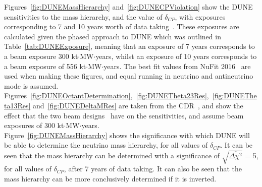 Figures~\ref{fig:DUNEMassHierarchy} and~\ref{fig:DUNECPViolation} show the DUNE sensitivities to the mass hierarchy, and the value of $\delta_{CP}$, with exposures corresponding to 7 and 10 years worth of data taking~\citep{Elizabeth_01_17}. These exposures are calculated given the phased approach to DUNE which was outlined in Table~\ref{tab:DUNEExposure}, meaning that an exposure of 7 years corresponds to a beam exposure 300 kt$\cdot$MW$\cdot$years, whilst an exposure of 10 years corresponds to a beam exposure of 556 kt$\cdot$MW$\cdot$years. The best fit values from NuFit 2016~\citep{NuFit2016} are used when making these figures, and equal running in neutrino and antineutrino mode is assumed. Figures~\ref{fig:DUNEOctantDetermination},~\ref{fig:DUNETheta23Res},~\ref{fig:DUNETheta13Res} and~\ref{fig:DUNEDeltaMRes} are taken from the CDR~\citep{DUNECDR_V2}, and show the effect that the two beam designs~\citep{DUNECDR_V3} have on the sensitivities, and assume beam exposures of 300 kt$\cdot$MW$\cdot$years. \\

Figure~\ref{fig:DUNEMassHierarchy} shows the significance with which DUNE will be able to determine the neutrino mass hierarchy, for all values of $\delta_{CP}$. It can be seen that the mass hierarchy can be determined with a significance of $\sqrt{\overline{\Delta{\chi^2}}}$ = 5, for all values of $\delta_{CP}$, after 7 years of data taking. It can also be seen that the mass hierarchy can be more conclusively determined if it is inverted. \\


